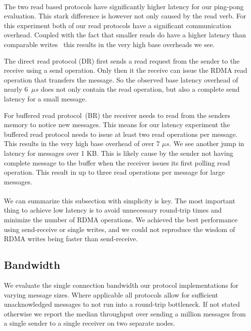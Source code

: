 \paragraph{} The two read based protocols have significantly higher latency for our ping-pong evaluation. This stark difference
is however not only caused by the read verb. For this experiment both of our read protocols have a significant 
communication overhead. Coupled with the fact that smaller reads do have a higher latency than comparable writes~\cite{}
this results in the very high base overheads we see.

The direct read protocol (DR) first sends a read request from the sender to the receive using a send operation. Only then it the
receive can issue the RDMA read operation that transfers the message. So the observed base latency overhead of nearly 6~$\mu s$
does not only contain the read operation, but also a complete send latency for a small message.

For buffered read protocol~(BR) the receiver needs to read from the senders memory to notice new messages. This means for our
latency experiment the buffered read protocol needs to issue at least two read operations per message. This results in the
very high base overhead of over 7 $\mu s$. We see another jump in latency for messages over 1 KB. This is likely cause by the
sender not having complete message to the buffer when the receiver issues its first polling read operation. This result in up 
to three read operations per message for large messages.

\paragraph{} We can summarize this subsection with simplicity is key. The most important thing to achieve low 
latency is to avoid unnecessary round-trip times and minimize the number of RDMA operations. We achieved the best performance 
using send-receive or single writes, and we could not reproduce the wisdom of RDMA writes being faster than send-receive.






\pagebreak

\subsection{Bandwidth}

We evaluate the single connection bandwidth our protocol implementations for varying message sizes. Where applicable all 
protocols allow for sufficient unacknowledged messages to not run into a round-trip bottleneck. If not 
stated otherwise we report the median throughput over sending a million messages from a single sender to a single receiver
on two separate nodes.

